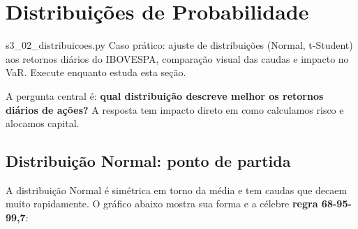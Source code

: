 \documentclass[11pt,a4paper]{article}
\theoremstyle{quant}
\begin{document}
\newpage

\section{Distribuições de Probabilidade}
\label{sec:distribuicoes}

\begin{caixapy}{s3\_02\_distribuicoes.py}
  Caso prático: ajuste de distribuições (Normal, t-Student) aos retornos diários
  do IBOVESPA, comparação visual das caudas e impacto no VaR.
  Execute enquanto estuda esta seção.
\end{caixapy}

A pergunta central é: \textbf{qual distribuição descreve melhor os retornos diários
de ações?} A resposta tem impacto direto em como calculamos risco e alocamos capital.

\subsection{Distribuição Normal: ponto de partida}

A distribuição Normal é simétrica em torno da média e tem caudas que decaem muito
rapidamente. O gráfico abaixo mostra sua forma e a célebre \textbf{regra 68-95-99,7}:
\end{document}
